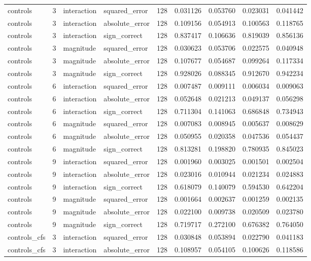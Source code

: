 \begin{tabular}{lrllrrrrr}
controls & 3 & interaction & squared_error & 128 & 0.031126 & 0.053760 & 0.023031 & 0.041442 \\
controls & 3 & interaction & absolute_error & 128 & 0.109156 & 0.054913 & 0.100563 & 0.118765 \\
controls & 3 & interaction & sign_correct & 128 & 0.837417 & 0.106636 & 0.819039 & 0.856136 \\
controls & 3 & magnitude & squared_error & 128 & 0.030623 & 0.053706 & 0.022575 & 0.040948 \\
controls & 3 & magnitude & absolute_error & 128 & 0.107677 & 0.054687 & 0.099264 & 0.117334 \\
controls & 3 & magnitude & sign_correct & 128 & 0.928026 & 0.088345 & 0.912670 & 0.942234 \\
controls & 6 & interaction & squared_error & 128 & 0.007487 & 0.009111 & 0.006034 & 0.009063 \\
controls & 6 & interaction & absolute_error & 128 & 0.052648 & 0.021213 & 0.049137 & 0.056298 \\
controls & 6 & interaction & sign_correct & 128 & 0.711304 & 0.141063 & 0.686848 & 0.734943 \\
controls & 6 & magnitude & squared_error & 128 & 0.007083 & 0.008945 & 0.005637 & 0.008629 \\
controls & 6 & magnitude & absolute_error & 128 & 0.050955 & 0.020358 & 0.047536 & 0.054437 \\
controls & 6 & magnitude & sign_correct & 128 & 0.813281 & 0.198820 & 0.780935 & 0.845023 \\
controls & 9 & interaction & squared_error & 128 & 0.001960 & 0.003025 & 0.001501 & 0.002504 \\
controls & 9 & interaction & absolute_error & 128 & 0.023016 & 0.010944 & 0.021234 & 0.024883 \\
controls & 9 & interaction & sign_correct & 128 & 0.618079 & 0.140079 & 0.594530 & 0.642204 \\
controls & 9 & magnitude & squared_error & 128 & 0.001664 & 0.002637 & 0.001259 & 0.002135 \\
controls & 9 & magnitude & absolute_error & 128 & 0.022100 & 0.009738 & 0.020509 & 0.023780 \\
controls & 9 & magnitude & sign_correct & 128 & 0.719717 & 0.272100 & 0.676382 & 0.764050 \\
controls_cfs & 3 & interaction & squared_error & 128 & 0.030848 & 0.053894 & 0.022790 & 0.041183 \\
controls_cfs & 3 & interaction & absolute_error & 128 & 0.108957 & 0.054105 & 0.100626 & 0.118586 \\

\end{tabular}
